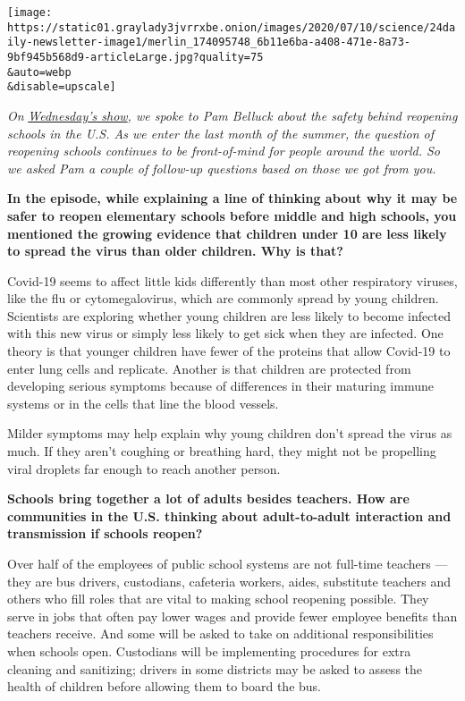 \texttt{[image: https://static01.graylady3jvrrxbe.onion/images/2020/07/10/science/24daily-newsletter-image1/merlin\_174095748\_6b11e6ba-a408-471e-8a73-9bf945b568d9-articleLarge.jpg?quality=75\\\&auto=webp\\\&disable=upscale]}

\emph{On}
\href{https://www.nytimes3xbfgragh.onion/2020/07/22/podcasts/the-daily/school-reopenings-coronavirus.html?}{\emph{Wednesday's
show}}\emph{, we spoke to Pam Belluck about the safety behind reopening
schools in the U.S. As we enter the last month of the summer, the
question of reopening schools continues to be front-of-mind for people
around the world. So we asked Pam a couple of follow-up questions based
on those we got from you.}

\textbf{In the episode, while explaining a line of thinking about why it
may be safer to reopen elementary schools before middle and high
schools, you mentioned the growing evidence that children under 10 are
less likely to spread the virus than older children. Why is that?}

Covid-19 seems to affect little kids differently than most other
respiratory viruses, like the flu or cytomegalovirus, which are commonly
spread by young children. Scientists are exploring whether young
children are less likely to become infected with this new virus or
simply less likely to get sick when they are infected. One theory is
that younger children have fewer of the proteins that allow Covid-19 to
enter lung cells and replicate. Another is that children are protected
from developing serious symptoms because of differences in their
maturing immune systems or in the cells that line the blood vessels.

Milder symptoms may help explain why young children don't spread the
virus as much. If they aren't coughing or breathing hard, they might not
be propelling viral droplets far enough to reach another person.

\textbf{Schools bring together a lot of adults besides teachers. How are
communities in the U.S. thinking about adult-to-adult interaction and
transmission if schools reopen?}

Over half of the employees of public school systems are not full-time
teachers --- they are bus drivers, custodians, cafeteria workers, aides,
substitute teachers and others who fill roles that are vital to making
school reopening possible. They serve in jobs that often pay lower wages
and provide fewer employee benefits than teachers receive. And some will
be asked to take on additional responsibilities when schools open.
Custodians will be implementing procedures for extra cleaning and
sanitizing; drivers in some districts may be asked to assess the health
of children before allowing them to board the bus.

